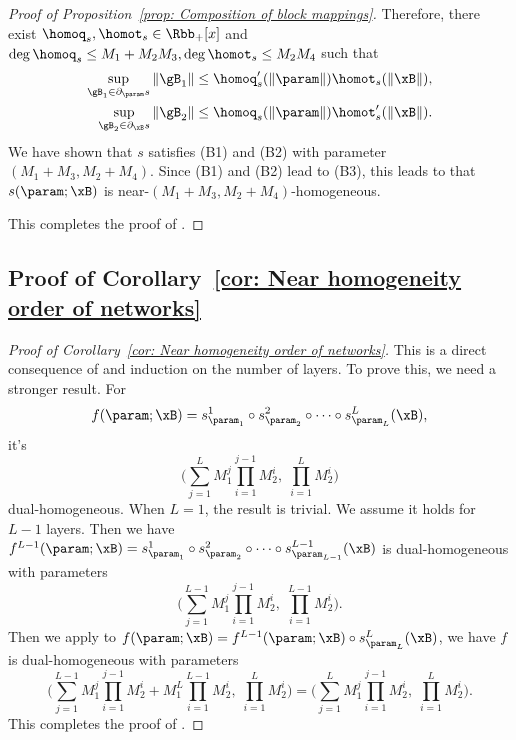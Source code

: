 \begin{proof}[Proof of Proposition~\ref{prop: Composition of block mappings}]
Therefore, there exist $\homoq_s , \homot_s \in \Rbb_+[x]$ and $\deg \homoq_s \le M_1 + M_2M_3, \deg \homot_s \le  M_2M_4$ such that  
\begin{align*}
    \sup_{\gB_1 \in \partial_{\param} s}\|\gB_1\| \le \homoq_s^\prime (\|\param\|) \homot_s(\|\xB\|),\\ 
    \sup_{\gB_2 \in \partial_{\xB} s}\|\gB_2\| \le \homoq_s (\|\param\|) \homot_s^\prime (\|\xB\|). 
\end{align*}
We have shown that $s$ satisfies (B1) and (B2) with parameter $(M_1 + M_3, M_2+ M_4)$.  Since (B1) and (B2) lead to (B3), this leads to that $s(\param;\xB)$ is near-$(M_1 + M_3, M_2+ M_4)$-homogeneous.

This completes the proof of . 
\end{proof}

\subsection{Proof of Corollary~\ref{cor: Near homogeneity order of networks}}
\label{sec:proof-43}
\begin{proof}[Proof of Corollary~\ref{cor: Near homogeneity order of networks}]
This is a direct consequence of  and induction on the number of layers.  To prove this, we need a stronger result. For 
\[
    f(\param;\xB) = s^1_{\param_1} \circ s^2_{\param_2} \circ \cdots \circ s^L_{\param_L}(\xB),
\]
it's 
\[
    \bigg( \sum_{j=1}^L M_1^j \prod_{i=1}^{j-1} M_2^i,\; \prod_{i=1}^{L} M_2^i \bigg)
\]
dual-homogeneous. 
When $L=1$, the result is trivial. We assume it holds for $L-1$ layers. Then we have $f^{L-1}(\param;\xB) = s^1_{\param_1} \circ s^2_{\param_2} \circ \cdots \circ s^{L-1}_{\param_{L-1}}(\xB)$  is dual-homogeneous with parameters
\[
    \bigg( \sum_{j=1}^{L-1} M_1^j \prod_{i=1}^{j-1} M_2^i,\; \prod_{i=1}^{L-1} M_2^i \bigg).
\]  
Then we apply  to $f(\param;\xB) = f^{L-1}(\param;\xB) \circ s^L_{\param_L}(\xB)$, we have $f$ is dual-homogeneous with parameters
\[
    \bigg( \sum_{j=1}^{L-1} M_1^j \prod_{i=1}^{j-1} M_2^i + M_1^{L} \prod_{i=1}^{L-1} M_2^i,\; \prod_{i=1}^{L} M_2^i \bigg) = \bigg( \sum_{j=1}^{L} M_1^j \prod_{i=1}^{j-1} M_2^i,\; \prod_{i=1}^{L} M_2^i \bigg).  
\]
This completes the proof of .
\end{proof}

